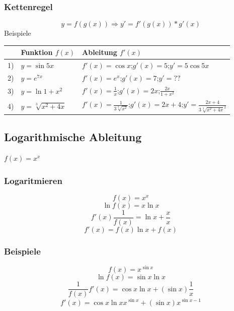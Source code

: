 \documentclass[11pt]{amsart}
\theoremstyle{remark}
\begin{document}
\subsubsection{Kettenregel}
\begin{equation*}
y = f(g(x)) \Rightarrow y' =f'(g(x))*g'(x)
\end{equation*}
Beispiele
\begin{table}[h]
\begin{center}
\begin{tabular}[t]{l|l|l}
 & Funktion $f(x)$ & Ableitung $f'(x)$ \\
\hline
1) & $y=\sin {5x}$ & $f'(x)=\cos x$;$g'(x)=5$;$y'=5\cos {5x}$ \\
2) & $y=e^{7x}$ & $f'(x)=e^x$;$g'(x)=7$;$y'=??$\\
3) & $y=\ln {1+x^2}$ & $f'(x)= \frac 1x$;$g'(x)=2x$;$\frac {2x}{1+x^2}$\\
4) & $y=\sqrt [3]{x^2 + 4x}$ & $f'(x)=\frac 1{3\sqrt [3]{x^2}}$;$g'(x)=2x+4$;$y'=\frac {2x+4}{3\sqrt [3]{x^2+4x}^2}$ \\
\end{tabular}
\end{center}
\label{default}
\end{table}


\subsection{Logarithmische Ableitung}
$f(x)=x^x$
\subsubsection{Logaritmieren}
\begin{equation*}
	f(x)=x^x
\end{equation*}
\begin{equation*}
	\ln {f(x)} = x \ln x
\end{equation*}
\begin{equation*}
	f'(x) \frac 1{f(x)} = \ln x + \frac xx
\end{equation*}
\begin{equation*}
	f'(x) = f(x) \ln x + f(x)
\end{equation*}
\subsubsection*{Beispiele}
\begin{equation}
	f(x) = x^{\sin x}
\end{equation}
\begin{equation*}
	\ln {f(x)} = \sin x\ln x
\end{equation*}
\begin{equation*}
	\frac 1{f(x)}f'(x)=\cos x\ln x + (\sin x)\frac 1x
\end{equation*}
\begin{equation*}
	f'(x) = \cos x\ln xx^{\sin x} + (\sin x)x^{\sin {x-1}}
\end{equation*}
\end{document}
